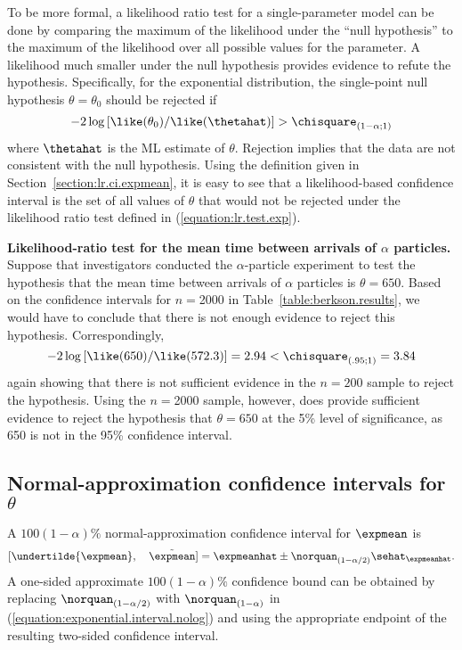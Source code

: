 To be more formal, a likelihood ratio test for a single-parameter
model can be done by comparing the maximum of the likelihood under the
``null hypothesis'' to the maximum of the likelihood over all possible
values for the parameter.  A likelihood much smaller under the null
hypothesis provides evidence to refute the hypothesis. Specifically,
for the exponential distribution, the single-point null hypothesis
$\theta=\theta_{0}$ should be rejected if
\begin{equation}
\label{equation:lr.test.exp}
-2\log \left [ { \like(\theta_{0})}/{ \like(\thetahat) } \right ] 
> \chisquare_{(1-\alpha;1)}
\end{equation}
where $\thetahat$ is the ML estimate of $\theta$.  Rejection implies
that the data are not consistent with the null hypothesis.  Using the
definition given in Section~\ref{section:lr.ci.expmean}, it is easy to
see that a likelihood-based confidence interval is the set of
all values of $\theta$ that would not be rejected under the likelihood
ratio test defined in (\ref{equation:lr.test.exp}).


\begin{example}
{\bf Likelihood-ratio test for the mean time between arrivals of
$\alpha$ particles.} Suppose that investigators conducted the
$\alpha$-particle experiment to test the hypothesis that the mean time
between arrivals of $\alpha$ particles is $\theta=650$. Based on the
confidence intervals for $n=$2000 in Table~\ref{table:berkson.results}, we
would have to conclude that there is not enough evidence to reject
this hypothesis. Correspondingly,
\begin{displaymath}
-2\log \left [{\like(650)}/{\like(572.3)}\right] 
= 2.94  < \chisquare_{(.95;1)} = 3.84
\end{displaymath} 
again showing that there is not sufficient evidence in the $n=200$
sample to reject the hypothesis.  Using the $n=$2000 sample, however, does
provide sufficient evidence to reject the hypothesis that
$\theta=650$ at the 5\%
level of significance, as 650 is not in the 95\% confidence
interval.
\end{example}

\subsection{Normal-approximation confidence intervals 
for $\theta$}
\label{section:normal.theory.exponential}
A $100(1-\alpha)\%$ normal-approximation confidence
interval for $\expmean$ is
\begin{equation}
\label{equation:exponential.interval.nolog}
 [ \undertilde{\expmean}, \quad \tilde{\expmean}] =
\expmeanhat \pm \norquan_{(1-\alpha/2)} \sehat_{\expmeanhat}.
\end{equation}
A one-sided approximate $100(1-\alpha)\%$
confidence bound can be obtained by replacing
$\norquan_{(1-\alpha/2)}$ with $\norquan_{(1-\alpha)}$ 
in (\ref{equation:exponential.interval.nolog}) and using the
appropriate endpoint of the resulting two-sided confidence interval.

